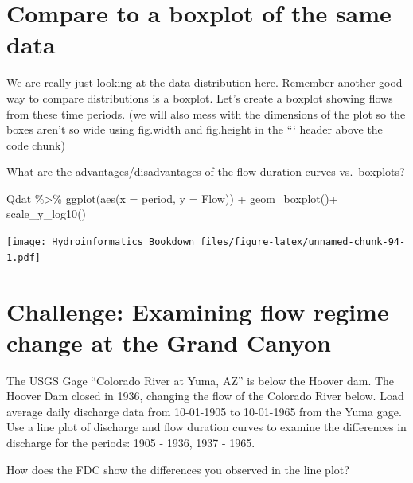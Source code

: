 \documentclass[
]{book}
\newenvironment{Shaded}{\begin{snugshade}}{\end{snugshade}}
\newcommand{\AttributeTok}[1]{\textcolor[rgb]{0.77,0.63,0.00}{#1}}
\newcommand{\FunctionTok}[1]{\textcolor[rgb]{0.00,0.00,0.00}{#1}}
\newcommand{\NormalTok}[1]{#1}
\newcommand{\SpecialCharTok}[1]{\textcolor[rgb]{0.00,0.00,0.00}{#1}}
\begin{document}
\hypertarget{compare-to-a-boxplot-of-the-same-data}{%
\section{Compare to a boxplot of the same data}\label{compare-to-a-boxplot-of-the-same-data}}

We are really just looking at the data distribution here. Remember another good way to compare distributions is a boxplot. Let's create a boxplot showing flows from these time periods. (we will also mess with the dimensions of the plot so the boxes aren't so wide using fig.width and fig.height in the ``` header above the code chunk)

What are the advantages/disadvantages of the flow duration curves vs.~boxplots?

\begin{Shaded}
\begin{Highlighting}[]
\NormalTok{Qdat }\SpecialCharTok{\%\textgreater{}\%} \FunctionTok{ggplot}\NormalTok{(}\FunctionTok{aes}\NormalTok{(}\AttributeTok{x =}\NormalTok{ period, }\AttributeTok{y =}\NormalTok{ Flow)) }\SpecialCharTok{+}
  \FunctionTok{geom\_boxplot}\NormalTok{()}\SpecialCharTok{+}
  \FunctionTok{scale\_y\_log10}\NormalTok{()}
\end{Highlighting}
\end{Shaded}

\texttt{[image: Hydroinformatics\_Bookdown\_files/figure-latex/unnamed-chunk-94-1.pdf]}

\hypertarget{challenge-examining-flow-regime-change-at-the-grand-canyon}{%
\section{Challenge: Examining flow regime change at the Grand Canyon}\label{challenge-examining-flow-regime-change-at-the-grand-canyon}}

The USGS Gage ``Colorado River at Yuma, AZ'' is below the Hoover dam. The Hoover Dam closed in 1936, changing the flow of the Colorado River below. Load average daily discharge data from 10-01-1905 to 10-01-1965 from the Yuma gage. Use a line plot of discharge and flow duration curves to examine the differences in discharge for the periods: 1905 - 1936, 1937 - 1965.

How does the FDC show the differences you observed in the line plot?
\end{document}
